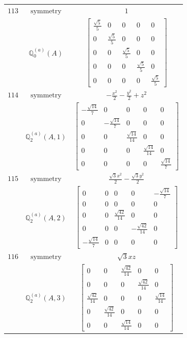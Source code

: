 \documentclass[fleqn,8pt,landscape]{jsarticle}
\begin{document}
\begin{longtable}{ccc}
$ 113 $ & $ \text{symmetry} $ & $ 1 $ \\
$  $ & $ \mathbb{Q}_{0}^{(a)}(A) $ & $ \begin{bmatrix} \frac{\sqrt{5}}{5} & 0 & 0 & 0 & 0 \\ 0 & \frac{\sqrt{5}}{5} & 0 & 0 & 0 \\ 0 & 0 & \frac{\sqrt{5}}{5} & 0 & 0 \\ 0 & 0 & 0 & \frac{\sqrt{5}}{5} & 0 \\ 0 & 0 & 0 & 0 & \frac{\sqrt{5}}{5} \end{bmatrix} $ \\ \hline
$ 114 $ & $ \text{symmetry} $ & $ - \frac{x^{2}}{2} - \frac{y^{2}}{2} + z^{2} $ \\
$  $ & $ \mathbb{Q}_{2}^{(a)}(A,1) $ & $ \begin{bmatrix} - \frac{\sqrt{14}}{7} & 0 & 0 & 0 & 0 \\ 0 & - \frac{\sqrt{14}}{7} & 0 & 0 & 0 \\ 0 & 0 & \frac{\sqrt{14}}{14} & 0 & 0 \\ 0 & 0 & 0 & \frac{\sqrt{14}}{14} & 0 \\ 0 & 0 & 0 & 0 & \frac{\sqrt{14}}{7} \end{bmatrix} $ \\ \hline
$ 115 $ & $ \text{symmetry} $ & $ \frac{\sqrt{3} x^{2}}{2} - \frac{\sqrt{3} y^{2}}{2} $ \\
$  $ & $ \mathbb{Q}_{2}^{(a)}(A,2) $ & $ \begin{bmatrix} 0 & 0 & 0 & 0 & - \frac{\sqrt{14}}{7} \\ 0 & 0 & 0 & 0 & 0 \\ 0 & 0 & \frac{\sqrt{42}}{14} & 0 & 0 \\ 0 & 0 & 0 & - \frac{\sqrt{42}}{14} & 0 \\ - \frac{\sqrt{14}}{7} & 0 & 0 & 0 & 0 \end{bmatrix} $ \\ \hline
$ 116 $ & $ \text{symmetry} $ & $ \sqrt{3} x z $ \\
$  $ & $ \mathbb{Q}_{2}^{(a)}(A,3) $ & $ \begin{bmatrix} 0 & 0 & \frac{\sqrt{42}}{14} & 0 & 0 \\ 0 & 0 & 0 & \frac{\sqrt{42}}{14} & 0 \\ \frac{\sqrt{42}}{14} & 0 & 0 & 0 & \frac{\sqrt{14}}{14} \\ 0 & \frac{\sqrt{42}}{14} & 0 & 0 & 0 \\ 0 & 0 & \frac{\sqrt{14}}{14} & 0 & 0 \end{bmatrix} $ \\ \hline

\end{longtable}
\end{document}
